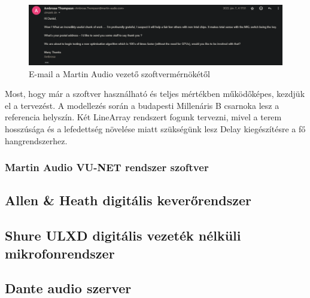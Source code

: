 \begin{figure}[!ht]
    \centering
    \includegraphics[width=150mm, keepaspectratio]{figures/ambrose_email.png}
    \caption{E-mail a Martin Audio vezető szoftvermérnökétől}
    \label{fig:ambrose_email}
\end{figure}


    
Most, hogy már a szoftver használható és teljes mértékben működőképes, kezdjük el a tervezést.
A modellezés során a budapesti Millenáris B csarnoka lesz a referencia helyszín. Két LineArray rendszert fogunk
tervezni, mivel a terem hosszúsága és a lefedettség növelése miatt szükségünk lesz Delay kiegészítésre a fő hangrendszerhez.








\subsubsection{Martin Audio VU-NET rendszer szoftver}



\subsection{Allen \& Heath digitális keverőrendszer}



\subsection{Shure ULXD digitális vezeték nélküli mikrofonrendszer}



\subsection{Dante audio szerver}




